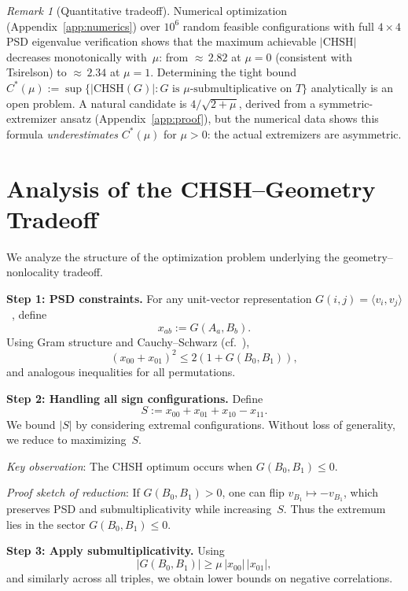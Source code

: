 \documentclass[11pt,a4paper]{article}
\theoremstyle{definition}
\theoremstyle{remark}
\newtheorem{remark}[theorem]{Remark}
\newcommand{\CHSH}{\mathrm{CHSH}}
\newcommand{\ip}[2]{\langle #1, #2 \rangle}
\begin{document}
\begin{remark}[Quantitative tradeoff]\label{rmk:tradeoff}
Numerical optimization (Appendix~\ref{app:numerics}) over $10^6$ random feasible configurations with full $4 \times 4$ PSD eigenvalue verification shows that the maximum achievable $|\CHSH|$ decreases monotonically with~$\mu$: from ${\approx}\,2.82$ at $\mu = 0$ (consistent with Tsirelson) to ${\approx}\,2.34$ at $\mu = 1$. Determining the tight bound $C^*(\mu) := \sup\{|\CHSH(G)| : G \text{ is $\mu$-submultiplicative on } T\}$ analytically is an open problem. A natural candidate is $4/\sqrt{2+\mu}$, derived from a symmetric-extremizer ansatz (Appendix~\ref{app:proof}), but the numerical data shows this formula \emph{underestimates} $C^*(\mu)$ for $\mu > 0$: the actual extremizers are asymmetric.
\end{remark}


\section{Analysis of the CHSH--Geometry Tradeoff}\label{sec:proof}

We analyze the structure of the optimization problem underlying the geometry--nonlocality tradeoff.

\medskip\noindent\textbf{Step 1: PSD constraints.}\quad
For any unit-vector representation $G(i,j) = \ip{v_i}{v_j}$~\cite{tsirelson1980,wehner2006}, define
\[
x_{ab} := G(A_a, B_b).
\]
Using Gram structure and Cauchy--Schwarz (cf.~\cite{tsirelson1987,wehner2006}),
\[
(x_{00}+x_{01})^2 \le 2(1 + G(B_0,B_1)),
\]
and analogous inequalities for all permutations.

\medskip\noindent\textbf{Step 2: Handling all sign configurations.}\quad
Define
\[
S := x_{00}+x_{01}+x_{10}-x_{11}.
\]
We bound $|S|$ by considering extremal configurations. Without loss of generality, we reduce to maximizing~$S$.

\emph{Key observation}: The CHSH optimum occurs when $G(B_0,B_1) \le 0$.

\emph{Proof sketch of reduction}: If $G(B_0,B_1) > 0$, one can flip $v_{B_1} \mapsto -v_{B_1}$, which preserves PSD and submultiplicativity while increasing~$S$. Thus the extremum lies in the sector $G(B_0,B_1) \le 0$.

\medskip\noindent\textbf{Step 3: Apply submultiplicativity.}\quad
Using
\[
|G(B_0,B_1)| \ge \mu\, |x_{00}|\, |x_{01}|,
\]
and similarly across all triples, we obtain lower bounds on negative correlations.
\end{document}
